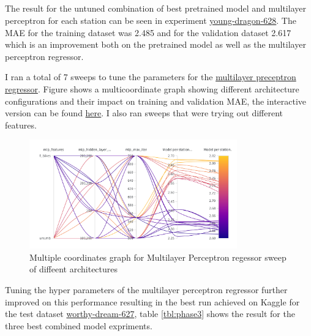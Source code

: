 \documentclass[a4paper]{article}
\begin{document}
    \subsection*{}

    The result for the untuned combination of best pretrained model and multilayer perceptron for each station can be seen
    in experiment \href{https://wandb.ai/idegen/mlp-2021/runs/ogsyvkqu?workspace=user-idegen}{young-dragon-628}. The
    MAE for the training dataset was 2.485 and for the validation dataset 2.617 which is an improvement both on the pretrained model
    as well as the multilayer perceptron regressor.

    I ran a total of 7 sweeps to tune the parameters for the \href{https://wandb.ai/idegen/mlp-2021/sweeps?workspace=user-idegen}{multilayer preceptron regressor}.
    Figure shows a multicoordinate graph showing different architecture configurations and their impact on training and
    validation MAE, the interactive version can be found \href{https://wandb.ai/idegen/mlp-2021/sweeps/rughds30?workspace=user-idegen}{here}.
    I also ran sweeps that were trying out different features.

    \begin{figure}[h]
        \centering
        \includegraphics[width=0.8\textwidth]{mlp-sweep}
        \caption{Multiple coordinates graph for Multilayer Perceptron regessor sweep of diffeent architectures}
        \label{fig:mlp-sweep}
    \end{figure}

    Tuning the hyper parameters of the multilayer perceptron regressor further improved on this performance resulting
    in the best run achieved on Kaggle for the test dataset
    \href{https://wandb.ai/idegen/mlp-2021/runs/2w4l1irf?workspace=user-idegen}{worthy-dream-627}, table
    \ref{tbl:phase3}
    shows the result for the three best combined model expriments.
\end{document}
